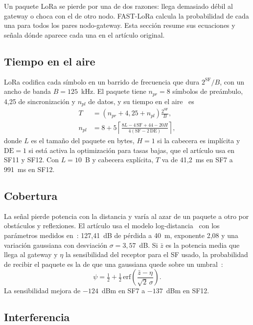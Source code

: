 \documentclass[conference,a4paper]{IEEEtran}
\begin{document}
Un paquete LoRa se pierde por una de dos razones: llega demasiado débil al gateway o choca con el de otro nodo. FAST-LoRa calcula la probabilidad de cada una para todos los pares nodo-gateway. Esta sección resume sus ecuaciones y señala dónde aparece cada una en el artículo original.

\subsection{Tiempo en el aire}

LoRa codifica cada símbolo en un barrido de frecuencia que dura $2^{\mathrm{SF}}/B$, con un ancho de banda $B=125$~kHz. El paquete tiene $n_{pr}=8$ símbolos de preámbulo, 4,25 de sincronización y $n_{pl}$ de datos, y su tiempo en el aire~\cite[ecs.~1 a 5]{fastlora} es
\begin{align}
  T&=\left(n_{pr}+4{,}25+n_{pl}\right)\frac{2^{\mathrm{SF}}}{B}, \label{eq:toa}\\
  n_{pl}&=8+5\left\lceil\frac{8L-4\,\mathrm{SF}+44-20H}{4(\mathrm{SF}-2\,\mathrm{DE})}\right\rceil, \nonumber
\end{align}
donde $L$ es el tamaño del paquete en bytes, $H=1$ si la cabecera es implícita y $\mathrm{DE}=1$ si está activa la optimización para tasas bajas, que el artículo usa en SF11 y SF12. Con $L=10$~B y cabecera explícita, $T$ va de 41,2~ms en SF7 a 991~ms en SF12.

\subsection{Cobertura}

La señal pierde potencia con la distancia y varía al azar de un paquete a otro por obstáculos y reflexiones. El artículo usa el modelo log-distancia~\cite[ec.~7]{fastlora} con los parámetros medidos en~\cite{bor}: 127,41~dB de pérdida a 40~m, exponente 2,08 y una variación gaussiana con desviación $\sigma=3{,}57$~dB. Si $\bar{z}$ es la potencia media que llega al gateway y $\eta$ la sensibilidad del receptor para el SF usado, la probabilidad de recibir el paquete es la de que una gaussiana quede sobre un umbral~\cite[ec.~8]{fastlora}:
\begin{equation}
  \psi=\tfrac12+\tfrac12\,\mathrm{erf}\!\left(\frac{\bar{z}-\eta}{\sqrt2\,\sigma}\right).
  \label{eq:psi}
\end{equation}
La sensibilidad mejora de $-124$~dBm en SF7 a $-137$~dBm en SF12.

\subsection{Interferencia}
\end{document}

